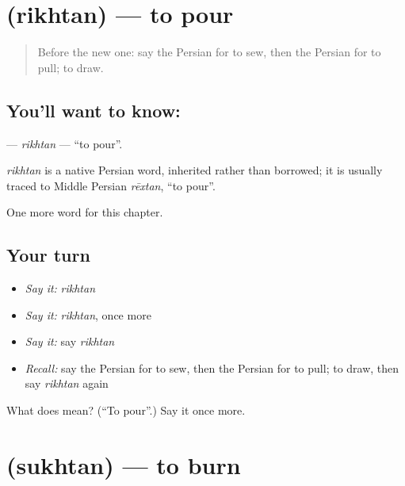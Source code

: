 \section[\texorpdfstring{\fa{ریختن} (rikhtan)}{ریختن (rikhtan)}]{ (rikhtan) — to pour}

\label{lesson:FA-C132-rikhtan}



\begin{quote}
Before the new one: say the Persian for to sew, then the Persian for to pull; to draw.
\end{quote}

\subsection*{You'll want to know: }
\textbf{} — \emph{rikhtan} — \textquotedblleft{}to pour\textquotedblright{}.

\begin{cousinweb}
\emph{rikhtan} is a native Persian word, inherited rather than borrowed; it is usually traced to Middle Persian \emph{rēxtan}, \textquotedblleft{}to pour\textquotedblright{}.
\end{cousinweb}

\begin{grammarlens}[title={What you've built}]
One more word for this chapter.
\end{grammarlens}

\subsection*{Your turn}
\begin{itemize}
\raggedright
  \item \emph{Say it:} \emph{rikhtan}
  \item \emph{Say it:} \emph{rikhtan}, once more
  \item \emph{Say it:} say \emph{rikhtan}
  \item \emph{Recall:} say the Persian for to sew, then the Persian for to pull; to draw, then say \emph{rikhtan} again
\end{itemize}

\begin{tcolorbox}[breakable,colback=teal!4,colframe=teal!35!black,title={Before you move on}]
What does  mean? (\textquotedblleft{}To pour\textquotedblright{}.) Say it once more.
\end{tcolorbox}
\section[\texorpdfstring{\fa{سوختن} (sukhtan)}{سوختن (sukhtan)}]{ (sukhtan) — to burn}

